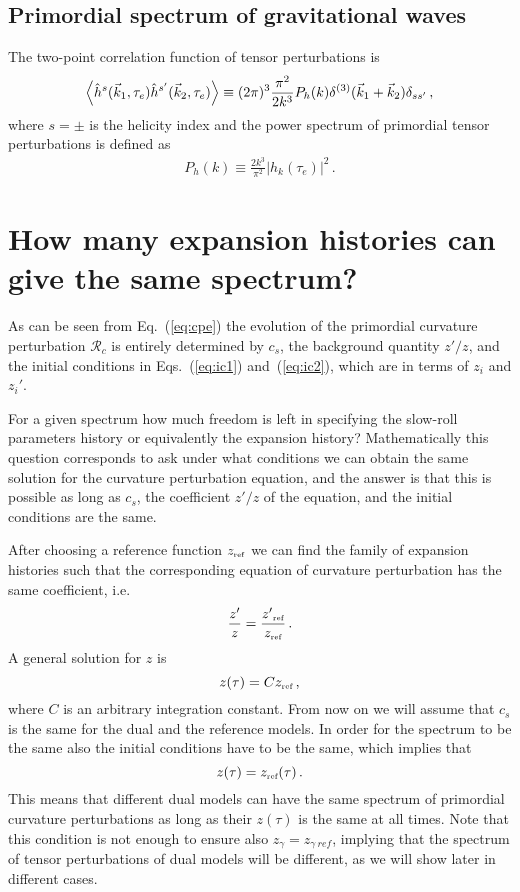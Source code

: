 \documentclass[aps,prl,amsmath,nofootinbib,twocolumn]{revtex4}
\newcommand{\3}{\partial}
\newcommand{\4}{\frac}
\newcommand{\5}{\delta}
\renewcommand\({\left(}
\renewcommand\){\right)}
\renewcommand\[{\left[}
\renewcommand\]{\right]}
\newcommand{\be}{\begin{equation}}
\newcommand{\ee}{\end{equation}}
\newcommand{\bea}{\begin{eqnarray}}
\newcommand{\eea}{\end{eqnarray}}
\newcommand{\reff}{{\mbox{\tiny ref}}}
\newcommand{\eqn}[1]{(\ref{#1})}
\begin{document}
\subsection{Primordial spectrum of gravitational waves}\label{psgw}
The two-point correlation function of tensor perturbations is 
\begin{equation}
 \Braket{ \hat{h}^{s}(\vec{k}_1, \tau_e) \hat{h}^{s'} (\vec{k}_2, \tau_e) } \equiv (2\pi)^3 
\frac{\pi^2}{2k^3} P_{h}(k) \delta^{(3)}(\vec{k}_1+\vec{k}_2) \delta_{s s'} \, ,
\end{equation}
where $s=\pm$ is the helicity  index and the power spectrum of primordial tensor perturbations is defined as
\bea
P_{h}(k) \equiv \frac{2k^3}{\pi^2}|h_k(\tau_e)|^2\,.
\eea

\section{How many expansion histories  can give the same spectrum?}\label{dcp}
As can be seen from Eq.~\eqn{eq:cpe} the evolution of the primordial curvature perturbation $\mathcal{R}_c$ is entirely determined by $c_s$, the 
background quantity $z'/z$, and the initial conditions in Eqs.~\eqn{eq:ic1} and~\eqn{eq:ic2}, which are in terms of $z_i$ and $z_i'$. 

For a given spectrum how much freedom is left in specifying the slow-roll parameters history or equivalently the expansion history?
Mathematically this question corresponds to ask under what conditions we can obtain the same solution for the curvature perturbation equation, and the answer is that this is possible as long as $c_s$, the coefficient $z'/z$ of the equation, and the initial conditions are the same. 

After choosing  a reference function $z_\reff$  we can find the family of expansion histories such that the corresponding equation of curvature perturbation has the same coefficient, i.e.
\be
\label{eq:zpz}
\frac{z'}{z} = \frac{z'{}_\reff }{z_\reff}\, . 
\ee
A general solution for $z$ is
\be
z(\tau) = C z_\reff \,,
\ee
where $C$ is an arbitrary integration constant. From now on we will assume that $c_s$ is the same for the dual and the reference models.
In order for the spectrum to be the same also the initial conditions have to be the same, which implies that %
\be
z (\tau) = z_\reff (\tau) \,.
\ee
This means that different dual models can have the same spectrum of primordial curvature perturbations as long as their $z(\tau)$ is the same at all times.
Note that this condition is not enough to ensure also $z_{\gamma}=z_{\gamma ~ref}$, implying that the spectrum of tensor perturbations of dual models will be different, as we will show later in different cases.
\end{document}
